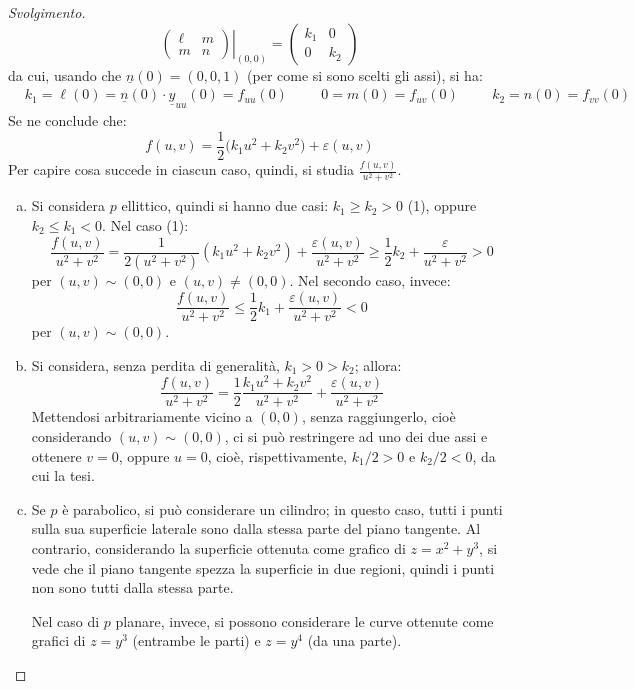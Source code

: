 \documentclass[12pt]{scrartcl}
\theoremstyle{style}
\newenvironment{svolgimento}{\renewcommand\qedsymbol{$\blacksquare$}\begin{proof}[Svolgimento]}{\end{proof}}
\newcommand*\Eval[3]{\left.#1\right\rvert_{#2}^{#3}}
\numberwithin{equation}{subsection}
\begin{document}
\begin{svolgimento}
\[
	\Eval{\begin{pmatrix} \ell & m \\ m & n \end{pmatrix} }{(0,0)}{}= \begin{pmatrix} k_1 & 0 \\ 0 & k_2 \end{pmatrix} 
\] 
da cui, usando che $\underline{n}(0) = (0,0,1)$ (per come si sono scelti gli assi), si ha:
\[
\begin{split}
	&k_1=\ell (0) = \underline{n}(0)  \cdot \underline{y}_{uu} (0)= f_{uu} (0) \hspace{1cm}0=m(0)= f_{uv} (0) \hspace{1cm} k_2 = n(0) = f_{vv} (0)
\end{split}
\] 
Se ne conclude che:
\[
f(u,v) = \frac{1}{2}\big(k_1 u^2 + k_2 v^2\big)+\varepsilon (u,v)
\] 
Per capire cosa succede in ciascun caso, quindi, si studia $\frac{f(u,v)}{u^2 + v^2}$.
\begin{enumerate}[(a).]
	\item Si considera $p$ ellittico, quindi si hanno due casi: $k_1\ge k_2 > 0$ (1), oppure $k_2 \le  k_1 < 0$.
		Nel caso (1):
		\[
		\frac{f(u,v)}{u^2 + v^2} = \frac{1}{2(u^2 + v^2 )} (k_1u^2 + k_2v^2) + \frac{\varepsilon (u,v)}{u^2 + v^2} \ge \frac{1}{2}k_2 + \frac{\varepsilon }{u^2 + v^2} > 0 
		\] 
		per $(u,v) \sim (0,0)$ e $(u,v) \neq (0,0)$.
		Nel secondo caso, invece:
		\[
		\frac{f(u,v)}{u^2 + v^2} \le  \frac{1}{2} k_1 + \frac{\varepsilon (u,v)}{u^2 + v^2}< 0
		\] 
		per $(u,v) \sim (0,0)$.
	\item Si considera, senza perdita di generalit\`a, $k_1 > 0 > k_2$; allora:
		\[
		\frac{f(u,v)}{u^2 + v^2} = \frac{1}{2} \frac{k_1u^2 + k_2 v^2}{u^2+ v^2} + \frac{\varepsilon (u,v)}{u^2 + v^2}
		\] 
		Mettendosi arbitrariamente vicino a $(0,0)$, senza raggiungerlo, cio\`e considerando $(u,v) \sim (0,0)$, ci si pu\`o restringere ad uno dei due assi e ottenere $v=0$, oppure $u=0$, cio\`e, rispettivamente, $k_1 / 2 > 0$ e $k_2 / 2 < 0 $, da cui la tesi.
	\item Se $p$ \`e parabolico, si pu\`o considerare un cilindro; in questo caso, tutti i punti sulla sua superficie laterale sono dalla stessa parte del piano tangente.
		Al contrario, considerando la superficie ottenuta come grafico di $z = x^2 + y^3$, si vede che il piano tangente spezza la superficie in due regioni, quindi i punti non sono tutti dalla stessa parte.

		Nel caso di $p$ planare, invece, si possono considerare le curve ottenute come grafici di $z= y^{3}$ (entrambe le parti) e $z = y^4$ (da una parte).
\end{enumerate}
\end{svolgimento}
\end{document}
